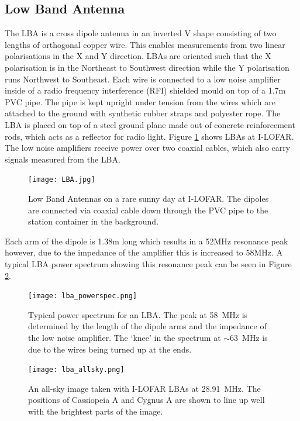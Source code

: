 \subsection{Low Band Antenna}
The LBA is a cross dipole antenna in an inverted V shape consisting of two lengths of orthogonal copper wire. This enables measurements from two linear polarisations in the X and Y direction. LBAs are oriented such that the X polarisation is in the Northeast to Southwest direction while the Y polarisation runs Northwest to Southeast. Each wire is connected to a low noise amplifier inside of a radio frequency interference (RFI) shielded mould on top of a 1.7m PVC pipe. The pipe is kept upright under tension from the wires which are attached to the ground with synthetic rubber straps and polyester rope. The LBA is placed on top of a steel ground plane made out of concrete reinforcement rods, which acts as a reflector for radio light. Figure \ref{fig:LBA} shows LBAs at I-LOFAR. The low noise amplifiers receive power over two coaxial cables, which also carry signals measured from the LBA.

\begin{figure}[ht]
\centering
\texttt{[image: LBA.jpg]}
\caption[Low Band Antennas at I-LOFAR.]{Low Band Antennas on a rare sunny day at I-LOFAR. The dipoles are connected via coaxial cable down through the PVC pipe to the station container in the background.}
\label{fig:LBA}
\end{figure}

Each arm of the dipole is 1.38m long which results in a 52MHz resonance peak however, due to the impedance of the amplifier this is increased to 58MHz. A typical LBA power spectrum showing this resonance peak can be seen in Figure \ref{fig:LBA_power_spec}.

\begin{figure}[ht]
    \centering
    \texttt{[image: lba\_powerspec.png]}
    \caption[Typical power spectrum for an LBA.]{Typical power spectrum for an LBA. The peak at 58~MHz is determined by the length of the dipole arms and the impedance of the low noise amplifier. The `knee' in the spectrum at $\sim 63$~MHz is due to the wires being turned up at the ends.}
    \label{fig:LBA_power_spec}
\end{figure}

\begin{figure}[ht]
\centering
\texttt{[image: lba\_allsky.png]}
\caption[A total intensity all sky image taken with I-LOFAR LBAs.]{An all-sky image taken with I-LOFAR LBAs at 28.91~MHz. The positions of Cassiopeia A and Cygnus A are shown to line up well with the brightest parts of the image.}
\label{fig:LBA_allsky}
\end{figure}

